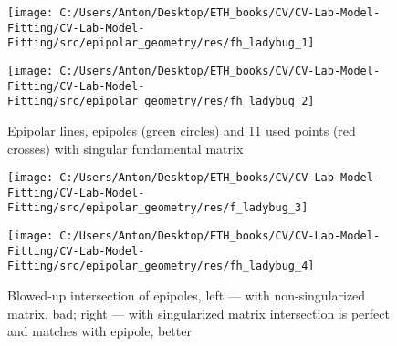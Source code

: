 \documentclass{report}
\begin{document}
\begin{figure}[h]
	\begin{center}
		\begin{minipage}[h]{0.49\linewidth}
			\texttt{[image: C:/Users/Anton/Desktop/ETH\_books/CV/CV-Lab-Model-Fitting/CV-Lab-Model-Fitting/src/epipolar\_geometry/res/fh\_ladybug\_1]}
		\end{minipage}
		\hfill
		\begin{minipage}[h]{0.49\linewidth}
			\texttt{[image: C:/Users/Anton/Desktop/ETH\_books/CV/CV-Lab-Model-Fitting/CV-Lab-Model-Fitting/src/epipolar\_geometry/res/fh\_ladybug\_2]}
		\end{minipage}

	\caption{Epipolar lines, epipoles (green circles) and 11 used points (red crosses) with singular fundamental matrix}
	\end{center}
\end{figure}

\begin{figure}[h!]
	\begin{center}
		\begin{minipage}[h]{0.49\linewidth}
			\texttt{[image: C:/Users/Anton/Desktop/ETH\_books/CV/CV-Lab-Model-Fitting/CV-Lab-Model-Fitting/src/epipolar\_geometry/res/f\_ladybug\_3]}
		\end{minipage}
		\hfill
		\begin{minipage}[h]{0.49\linewidth}
			\texttt{[image: C:/Users/Anton/Desktop/ETH\_books/CV/CV-Lab-Model-Fitting/CV-Lab-Model-Fitting/src/epipolar\_geometry/res/fh\_ladybug\_4]}
		\end{minipage}
		
		\caption{Blowed-up intersection of epipoles, left --- with non-singularized matrix, bad; right --- with singularized matrix intersection is perfect and matches with epipole, better}
	\end{center}
\end{figure}
\end{document}
